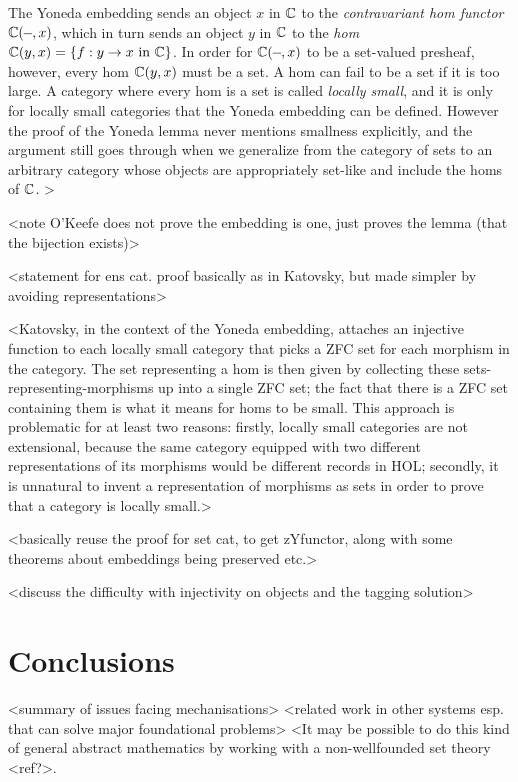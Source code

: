 \documentclass[twoside,titlepage,11pt]{article}
\begin{document}
The Yoneda embedding sends an object $x$ in $\mathbb{C}$ to the \emph{contravariant hom functor} $\C(\blank,x)$, which in turn sends an object $y$ in $\mathbb{C}$ to the \emph{hom} $\mathbb{C}(y,x)=\{f:y\to x\text{ in $\mathbb{C}$}\}$.
In order for $\C(\blank,x)$ to be a set-valued presheaf, however, every hom $\mathbb{C}(y,x)$ must be a set.
A hom can fail to be a set if it is too large.
A category where every hom is a set is called \emph{locally small}, and it is only for locally small categories that the Yoneda embedding can be defined.
However the proof of the Yoneda lemma never mentions smallness explicitly, and the argument still goes through when we generalize from the category of sets to an arbitrary category whose objects are appropriately set-like and include the homs of $\mathbb{C}$.
>

<note O'Keefe does not prove the embedding is one, just proves the lemma (that the bijection exists)>

<statement for ens cat. proof basically as in Katovsky, but made simpler by avoiding representations>

<Katovsky, in the context of the Yoneda embedding, attaches an injective function to each locally small category that picks a ZFC set for each morphism in the category.
The set representing a hom is then given by collecting these sets-representing-morphisms up into a single ZFC set; the fact that there is a ZFC set containing them is what it means for homs to be small.
This approach is problematic for at least two reasons: firstly, locally small categories are not extensional, because the same category equipped with two different representations of its morphisms would be different records in HOL; secondly, it is unnatural to invent a representation of morphisms as sets in order to prove that a category is locally small.>

<basically reuse the proof for set cat, to get zYfunctor, along with some theorems about embeddings being preserved etc.>

<discuss the difficulty with injectivity on objects and the tagging solution>
\section{Conclusions}%
<summary of issues facing mechanisations>
<related work in other systems esp. that can solve major foundational problems>
<It may be possible to do this kind of general abstract mathematics by working with a non-wellfounded set theory <ref?>.


\end{document}
